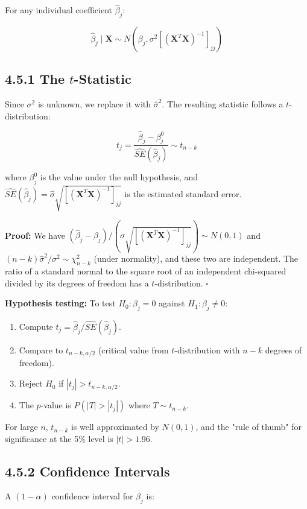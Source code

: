 For any individual coefficient $\hat{\beta}_j$:

\[
\hat{\beta}_j \mid \mathbf{X} \sim N\left(\beta_j, \sigma^2 [(\mathbf{X}^T\mathbf{X})^{-1}]_{jj}\right)
\]

\subsection{4.5.1 The $t$-Statistic}

Since $\sigma^2$ is unknown, we replace it with $\hat{\sigma}^2$. The resulting statistic follows a $t$-distribution:

\[
t_j = \frac{\hat{\beta}_j - \beta_j^0}{\widehat{SE}(\hat{\beta}_j)} \sim t_{n-k}
\]

where $\beta_j^0$ is the value under the null hypothesis, and $\widehat{SE}(\hat{\beta}_j) = \hat{\sigma}\sqrt{[(\mathbf{X}^T\mathbf{X})^{-1}]_{jj}}$ is the estimated standard error.

\textbf{Proof:} We have $(\hat{\beta}_j - \beta_j) / (\sigma \sqrt{[(\mathbf{X}^T\mathbf{X})^{-1}]_{jj}}) \sim N(0,1)$ and $(n-k)\hat{\sigma}^2/\sigma^2 \sim \chi^2_{n-k}$ (under normality), and these two are independent. The ratio of a standard normal to the square root of an independent chi-squared divided by its degrees of freedom has a $t$-distribution. $\square$

\textbf{Hypothesis testing:} To test $H_0: \beta_j = 0$ against $H_1: \beta_j \neq 0$:

\begin{enumerate}
\item Compute $t_j = \hat{\beta}_j / \widehat{SE}(\hat{\beta}_j)$.
\item Compare to $t_{n-k, \alpha/2}$ (critical value from $t$-distribution with $n-k$ degrees of freedom).
\item Reject $H_0$ if $|t_j| > t_{n-k, \alpha/2}$.
\item The $p$-value is $P(|T| > |t_j|)$ where $T \sim t_{n-k}$.
\end{enumerate}

For large $n$, $t_{n-k}$ is well approximated by $N(0,1)$, and the "rule of thumb" for significance at the 5\% level is $|t| > 1.96$.

\subsection{4.5.2 Confidence Intervals}

A $(1-\alpha)$ confidence interval for $\beta_j$ is:

